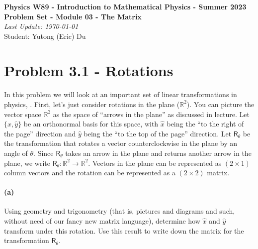 \documentclass{article}
\begin{document}
\addcopyright
\begin{center}
{\bf \large Physics W89 - Introduction to Mathematical Physics - Summer 2023}\\\medskip
{\bf \large Problem Set - Module 03 - The Matrix} \\\medskip
{\emph{Last Update: \today}\\}
{Student: Yutong (Eric) Du}
\end{center}


\dphline\bigskip
\section*{Problem 3.1 - Rotations}

\paragraph{}
In this problem we will look at an important set of linear transformations in physics, .
First, let's just consider rotations in the plane ($\mathbb{R}^{2}$).  You can picture the vector space $\mathbb{R}^{2}$ as the space of ``arrows in the plane'' 
as discussed in lecture.  Let $\{\hat{x},\hat{y}\}$ be an orthonormal basis for this space, with $\hat{x}$ being the ``to the right of the page'' direction and $\hat{y}$ being the 
``to the top of the page'' direction.  Let $\mathsf{R}_{\theta}$ be the transformation that rotates a vector counterclockwise in the plane by an angle of $\theta$.  Since
$\mathsf{R}_{\theta}$ takes an arrow in the plane and returns another arrow in the plane, we write $\mathsf{R}_{\theta}: \mathbb{R}^{2} \to \mathbb{R}^{2}$.  
Vectors in the plane can be represented as $(2\times 1)$ column vectors and the rotation can be represented as a $(2\times 2)$ matrix.


\paragraph{(a)}
Using geometry and trigonometry (that is, pictures and diagrams and such, without need of our fancy new matrix language), determine how $\hat{x}$ and $\hat{y}$ 
transform under this rotation.  Use this result to write down the matrix for the transformation $\mathsf{R}_{\theta}$.
\end{document}
